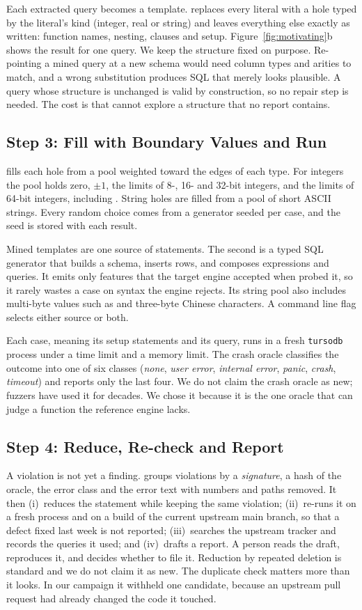 Each extracted query becomes a template. \tool replaces every literal with a
hole typed by the literal's kind (integer, real or string) and leaves everything
else exactly as written: function names, nesting, clauses and setup.
Figure~\ref{fig:motivating}b shows the result for one query. We keep the
structure fixed on purpose. Re-pointing a mined query at a new schema would need
column types and arities to match, and a wrong substitution produces SQL that
merely looks plausible. A query whose structure is unchanged is valid by
construction, so no repair step is needed. The cost is that \tool cannot explore
a structure that no report contains.

\subsection{Step 3: Fill with Boundary Values and Run}
\label{sec:step-run}
\tool fills each hole from a pool weighted toward the edges of each type. For
integers the pool holds zero, $\pm 1$, the limits of 8-, 16- and 32-bit integers,
and the limits of 64-bit integers, including \imax. String holes are filled from
a pool of short ASCII strings. Every random choice comes from a generator seeded
per case, and the seed is stored with each result.

Mined templates are one source of statements. The second is a typed SQL generator
that builds a schema, inserts rows, and composes expressions and queries. It
emits only features that the target engine accepted when \tool probed it, so it
rarely wastes a case on syntax the engine rejects. Its string pool also includes
multi-byte values such as  and three-byte Chinese characters. A command
line flag selects either source or both.

Each case, meaning its setup statements and its query, runs in a fresh
\texttt{tursodb} process under a time limit and a memory limit. The crash oracle
classifies the outcome into one of six classes (\emph{none}, \emph{user error},
\emph{internal error}, \emph{panic}, \emph{crash}, \emph{timeout}) and reports
only the last four. We do not claim the crash oracle as new; fuzzers have used it
for decades. We chose it because it is the one oracle that can judge a function
the reference engine lacks.

\subsection{Step 4: Reduce, Re-check and Report}
\label{sec:step-triage}
A violation is not yet a finding. \tool groups violations by a \emph{signature},
a hash of the oracle, the error class and the error text with numbers and paths
removed. It then (i)~reduces the statement while keeping the same violation;
(ii)~re-runs it on a fresh process and on a build of the current upstream main
branch, so that a defect fixed last week is not reported; (iii)~searches the
upstream tracker and records the queries it used; and (iv)~drafts a report. A
person reads the draft, reproduces it, and decides whether to file it. Reduction
by repeated deletion is standard and we do not claim it as new. The duplicate
check matters more than it looks. In our campaign it withheld one candidate,
because an upstream pull request had already changed the code it touched.
